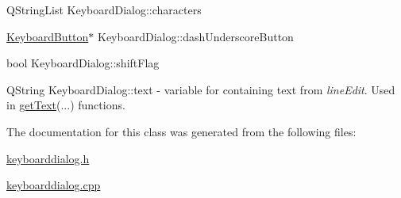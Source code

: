 \mbox{\label{classKeyboardDialog_a6a084cc6108c5fc50c05f567d241af8b}} 
{\footnotesize\ttfamily Q\+String\+List Keyboard\+Dialog\+::\texorpdfstring{characters}{characters}{\ttfamily [private]}}

\mbox{\label{classKeyboardDialog_a9cbeeb36e8ca22c07310316f67a95832}} 
{\footnotesize\ttfamily \mbox{\hyperlink{classKeyboardButton}{Keyboard\+Button}}$\ast$ Keyboard\+Dialog\+::\texorpdfstring{dash\+Underscore\+Button}{dashUnderscoreButton}{\ttfamily [private]}}

\mbox{\label{classKeyboardDialog_aad63f68247d9c00db715a2afb1bf9bc3}} 
{\footnotesize\ttfamily bool Keyboard\+Dialog\+::\texorpdfstring{shift\+Flag}{shiftFlag}{\ttfamily [private]}}

\mbox{\label{classKeyboardDialog_a840896bed408c1e8cdb44e27dee9d195}} 
{\footnotesize\ttfamily Q\+String Keyboard\+Dialog\+::\texorpdfstring{text}{text}{\ttfamily [private]}} - variable for containing text from \textit{line\+Edit}. Used in \hyperlink{classKeyboardDialog_ab76b5389fc4f4628b2fa6897da0efa28}{get\+Text}(...) functions.

The documentation for this class was generated from the following files\+:\begin{DoxyCompactItemize}
\item 
\mbox{\hyperlink{keyboarddialog_8h}{keyboarddialog.\+h}}\item 
\mbox{\hyperlink{keyboarddialog_8cpp}{keyboarddialog.\+cpp}}\end{DoxyCompactItemize}
\newpage